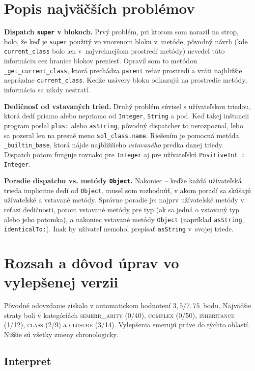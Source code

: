 \documentclass[a4paper, 11pt]{article}
\begin{document}
\section{Popis najväčších problémov}

\textbf{Dispatch \texttt{super} v blokoch.} Prvý problém, pri ktorom som
narazil na strop, bolo, že keď je \texttt{super} použitý vo vnorenom bloku
v~metóde, pôvodný návrh (kde \texttt{current\_class} bolo len v~najvrchnejšom
prostredí metódy) nevedel túto informáciu cez hranice blokov preniesť.
Opravil som to metódou \texttt{\_get\_current\_class}, ktorá prechádza
\texttt{parent} reťaz prostredí a vráti najbližšie neprázdne
\texttt{current\_class}. Keďže uzávery bloku odkazujú na prostredie metódy,
informácia sa nikdy nestratí.

\textbf{Dedičnosť od vstavaných tried.} Druhý problém súvisel s užívateľskou
triedou, ktorá dedí priamo alebo nepriamo od \texttt{Integer}, \texttt{String}
a pod. Keď takej inštancii program poslal \texttt{plus:} alebo \texttt{asString},
pôvodný dispatcher to nerozpoznal, lebo sa pozeral len na presné meno
\texttt{sol\_class.name}. Riešením je pomocná metóda \texttt{\_builtin\_base},
ktorá nájde najbližšieho \emph{vstavaného} predka danej triedy. Dispatch potom
funguje rovnako pre \texttt{Integer} aj pre užívateľskú \texttt{PositiveInt
: Integer}.

\textbf{Poradie dispatchu vs. metódy \texttt{Object}.} Nakoniec -- keďže
každá užívateľská trieda implicitne dedí od \texttt{Object}, musel som
rozhodnúť, v akom poradí sa skúšajú užívateľské a vstavané metódy. Správne
poradie je: najprv užívateľské metódy v reťazi dedičnosti, potom vstavané
metódy pre typ (ak sa jedná o vstavaný typ alebo jeho potomka), a nakoniec
vstavané metódy \texttt{Object} (napríklad \texttt{asString},
\texttt{identicalTo:}). Inak by užívateľ nemohol prepísať \texttt{asString}
v~svojej triede.

\section{Rozsah a dôvod úprav vo vylepšenej verzii}

Pôvodné odovzdanie získalo v automatickom hodnotení $3{,}5/7{,}75$~bodu.
Najväčšie straty boli v kategóriách \textsc{semerr\_arity} (0/40),
\textsc{complex} (0/50), \textsc{inheritance} (1/12), \textsc{class} (2/9)
a \textsc{closure} (3/14). Vylepšenia smerujú práve do týchto oblastí.
Nižšie sú všetky zmeny chronologicky.

\subsection*{Interpret}
\end{document}
